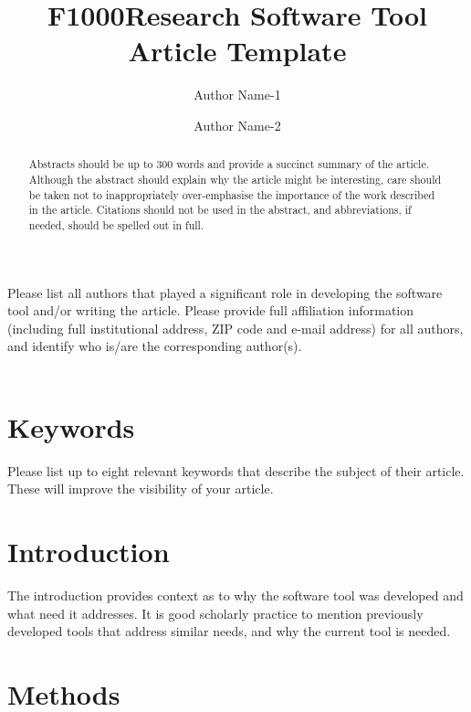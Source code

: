 \documentclass[10pt,a4paper]{article}
\begin{document}
\pagestyle{fancy}

\title{F1000Research Software Tool Article Template}
\author[1]{Author Name-1}
\author[2]{Author Name-2}

\maketitle
\thispagestyle{fancy}

Please list all authors that played a significant role in developing the software tool and/or writing the article. Please provide full affiliation information (including full institutional address, ZIP code and e-mail address) for all authors, and identify who is/are the corresponding author(s).
\\
\\
\begin{abstract}

Abstracts should be up to 300 words and provide a succinct summary of the article. Although the abstract should explain why the article might be interesting, care should be taken not to inappropriately over-emphasise the importance of the work described in the article. Citations should not be used in the abstract, and abbreviations, if needed, should be spelled out in full.

\end{abstract}

\section*{\color{f1ROrange}Keywords}

Please list up to eight relevant keywords that describe the subject of their article. These will improve the visibility of your article.


\clearpage
\pagestyle{fancy}
\section*{Introduction}

The introduction provides context as to why the software tool was developed and what need it addresses.  It is good scholarly practice to mention previously developed tools that address similar needs, and why the current tool is needed. 

\section*{Methods}
\end{document}
